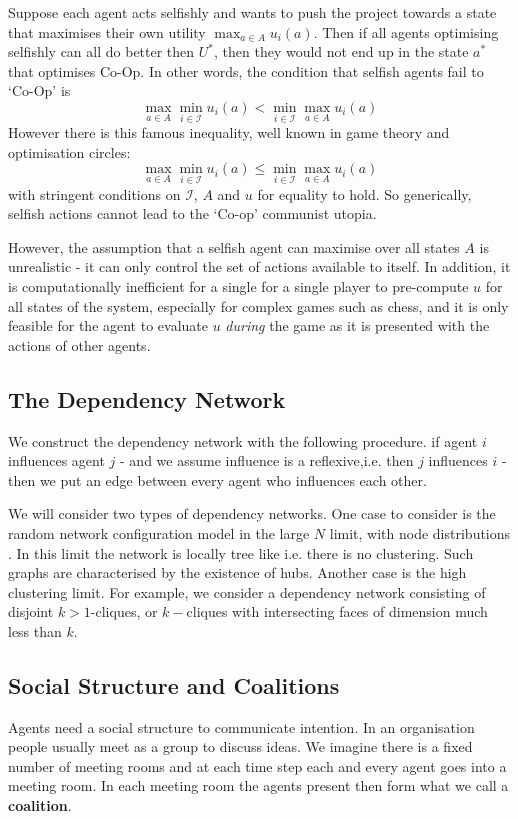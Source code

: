 Suppose each agent acts selfishly and wants to push the project towards a state that maximises their own utility $\max_{a \in A} u_i(a)$. Then if all agents optimising selfishly can all do better then $U^\ast$, then they would not end up in the state $a^\ast$ that optimises Co-Op. In other words, the condition that selfish agents fail to `Co-Op' is
\begin{equation}
\max_{a \in A} \min_{i \in \mathcal{I}} u_i(a) < \min_{i \in \mathcal{I}} \max_{a \in A} u_i(a)
\end{equation}
However there is this famous inequality, well known in game theory and optimisation circles:
$$ \max_{a \in A} \min_{i \in \mathcal{I}} u_i(a)   \leq \min_{i \in \mathcal{I}} \max_{a \in A} u_i(a)$$ with stringent conditions on $\mathcal{I}$, $A$ and $u$ for equality to hold. So generically, selfish actions cannot lead to the  `Co-op' communist utopia.

However, the assumption that a selfish agent can maximise over all states $A$ is unrealistic - it can only control the set of actions available to itself. In addition, it is computationally inefficient for a single for a single player to pre-compute $u$ for all states of the system, especially for complex games such as chess, and it is only feasible for the agent to evaluate $u$ \emph{during} the game as it is presented with the actions of other agents.


\subsection{The Dependency Network}
We construct the dependency network with the following procedure. if agent $i$ influences agent $j$ - and we assume influence is a reflexive,i.e. then $j$ influences $i$ - then we put an edge between every agent who influences each other.

We will consider two types of dependency networks. One case to consider is the random network configuration model in the large $N$ limit, with node distributions . In this limit the network is locally tree like i.e. there is no clustering. Such graphs are characterised by the existence of hubs. Another case is the high clustering limit. For example, we consider a dependency network consisting of disjoint $k>1$-cliques, or $k-$cliques with intersecting faces of dimension much less than $k$.

\subsection{Social Structure and Coalitions}
Agents need a social structure to communicate intention. In an organisation people usually meet as a group to discuss ideas. We imagine there is a fixed number of meeting rooms and at each time step each and every agent goes into a meeting room. In each meeting room the agents present then form what we call a \textbf{coalition}.

